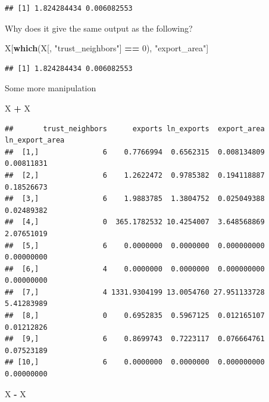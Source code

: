 \documentclass[
]{book}
\newenvironment{Shaded}{\begin{snugshade}}{\end{snugshade}}
\newcommand{\DecValTok}[1]{\textcolor[rgb]{0.00,0.00,0.81}{#1}}
\newcommand{\KeywordTok}[1]{\textcolor[rgb]{0.13,0.29,0.53}{\textbf{#1}}}
\newcommand{\NormalTok}[1]{#1}
\newcommand{\OperatorTok}[1]{\textcolor[rgb]{0.81,0.36,0.00}{\textbf{#1}}}
\newcommand{\StringTok}[1]{\textcolor[rgb]{0.31,0.60,0.02}{#1}}
\theoremstyle{definition}
\theoremstyle{definition}
\theoremstyle{definition}
\theoremstyle{definition}
\theoremstyle{remark}
\begin{document}
\begin{verbatim}
## [1] 1.824284434 0.006082553
\end{verbatim}

Why does it give the same output as the following?

\begin{Shaded}
\begin{Highlighting}[]
\NormalTok{X[}\KeywordTok{which}\NormalTok{(X[, }\StringTok{"trust_neighbors"}\NormalTok{] }\OperatorTok{==}\StringTok{ }\DecValTok{0}\NormalTok{), }\StringTok{"export_area"}\NormalTok{]}
\end{Highlighting}
\end{Shaded}

\begin{verbatim}
## [1] 1.824284434 0.006082553
\end{verbatim}

Some more manipulation

\begin{Shaded}
\begin{Highlighting}[]
\NormalTok{X }\OperatorTok{+}\StringTok{ }\NormalTok{X}
\end{Highlighting}
\end{Shaded}

\begin{verbatim}
##       trust_neighbors      exports ln_exports  export_area ln_export_area
##  [1,]               6    0.7766994  0.6562315  0.008134809     0.00811831
##  [2,]               6    1.2622472  0.9785382  0.194118887     0.18526673
##  [3,]               6    1.9883785  1.3804752  0.025049388     0.02489382
##  [4,]               0  365.1782532 10.4254007  3.648568869     2.07651019
##  [5,]               6    0.0000000  0.0000000  0.000000000     0.00000000
##  [6,]               4    0.0000000  0.0000000  0.000000000     0.00000000
##  [7,]               4 1331.9304199 13.0054760 27.951133728     5.41283989
##  [8,]               0    0.6952835  0.5967125  0.012165107     0.01212826
##  [9,]               6    0.8699743  0.7223117  0.076664761     0.07523189
## [10,]               6    0.0000000  0.0000000  0.000000000     0.00000000
\end{verbatim}

\begin{Shaded}
\begin{Highlighting}[]
\NormalTok{X }\OperatorTok{-}\StringTok{ }\NormalTok{X}
\end{Highlighting}
\end{Shaded}
\end{document}
